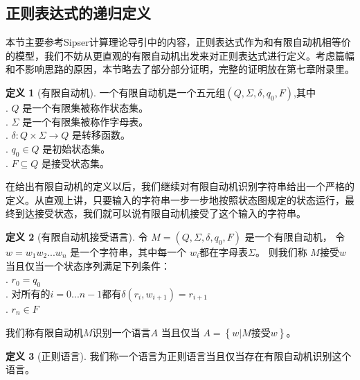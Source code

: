 \documentclass[openany,oneside]{book}
\theoremstyle{definition}
\newtheorem{definition}{\hspace{2em}定义}[chapter]
\theoremstyle{definition}
\begin{document}
\subsection{正则表达式的递归定义}
	本节主要参考Sipser\cite{Sips05a}计算理论导引中的内容，正则表达式作为和有限自动机相等价的模型，我们不妨从更直观的有限自动机出发来对正则表达式进行定义。考虑篇幅和不影响思路的原因，本节略去了部分部分证明，完整的证明放在第七章附录里。
	\begin{definition}[有限自动机]
		一个有限自动机是一个五元组\(\left( Q,\Sigma,\delta,q_0,F\right) \),其中\\
		\indent {}. \(Q\) 是一个有限集被称作状态集。\\
		\indent {}. \(\Sigma\) 是一个有限集被称作字母表。\\
		\indent {}. \(\delta : Q \times \Sigma \rightarrow Q\) 是转移函数。\\
		\indent {}. \(q_0 \in Q\) 是初始状态集。\\
		\indent {}. \(F \subseteq Q\) 是接受状态集。
	\end{definition}
	在给出有限自动机的定义以后，我们继续对有限自动机识别字符串给出一个严格的定义。从直观上讲，只要输入的字符串一步一步地按照状态图规定的状态运行，最终到达接受状态，我们就可以说有限自动机接受了这个输入的字符串。
	\begin{definition}[有限自动机接受语言]
		令 \(M = \left( Q,\Sigma,\delta,q_0,F\right)\) 是一个有限自动机， 令 \( w = w_1 w_2 ... w_n\) 是一个字符串，其中每一个 \(w_i\)都在字母表\(\Sigma\)。 则我们称 \(M\)接受\(w\)当且仅当一个状态序列满足下列条件：\\
		\indent {}. \(r_0 = q_0\)\\
		\indent {}. 对所有的\(i = 0... n -1\)都有\(\delta \left( r_i, w_{i+1}\right) = r_{i+1}\)\\
		\indent {}. \(r_n \in F\)
	\end{definition}
	我们称有限自动机\(M\)识别一个语言\(A\) 当且仅当 \(A = \left\lbrace w | M \mbox{接受} w\right\rbrace \)。\\
	\begin{definition}[正则语言]
		我们称一个语言为正则语言当且仅当存在有限自动机识别这个语言。
	\end{definition}
	
\end{document}
